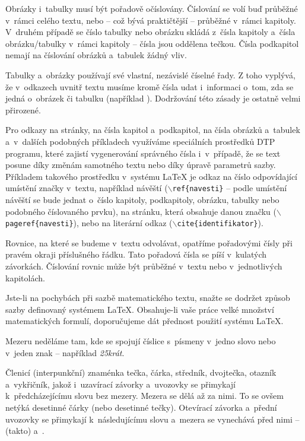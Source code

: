 Obrázky i~tabulky musí být pořadově očíslovány. Číslování se volí buď průběžné v~rámci celého textu, nebo -- což bývá praktičtější -- průběžné v~rámci kapitoly. V~druhém případě se číslo tabulky nebo obrázku skládá z~čísla kapitoly a~čísla obrázku/tabulky v~rámci kapitoly -- čísla jsou oddělena tečkou. Čísla podkapitol nemají na číslování obrázků a~tabulek žádný vliv.

Tabulky a~obrázky používají své vlastní, nezávislé číselné řady. Z toho vyplývá, že v~odkazech uvnitř textu musíme kromě čísla udat i~informaci o~tom, zda se jedná o~obrázek či tabulku (například ). Dodržování této zásady je ostatně velmi přirozené.

Pro odkazy na stránky, na čísla kapitol a~podkapitol, na čísla obrázků a~tabulek a~v~dalších podobných příkladech využíváme speciálních prostředků DTP programu, které zajistí vygenerování správného čísla i~v~případě, že se text posune díky změnám samotného textu nebo díky úpravě parametrů sazby. Příkladem takového prostředku v~systému LaTeX je odkaz na číslo odpovídající umístění značky v~textu, například návěští ($\backslash${\tt ref\{navesti\}} -- podle umístění návěští se bude jednat o~číslo kapitoly, podkapitoly, obrázku, tabulky nebo podobného číslovaného prvku), na stránku, která obsahuje danou značku ($\backslash${\tt pageref\{navesti\}}), nebo na literární odkaz ($\backslash${\tt cite\{identifikator\}}).

Rovnice, na které se budeme v~textu odvolávat, opatříme pořadovými čísly při pravém okraji příslušného řádku. Tato pořadová čísla se píší v~kulatých závorkách. Číslování rovnic může být průběžné v~textu nebo v~jednotlivých kapitolách.

Jste-li na pochybách při sazbě matematického textu, snažte se dodržet způsob sazby definovaný systémem LaTeX. Obsahuje-li vaše práce velké množství matematických formulí, doporučujeme dát přednost použití systému LaTeX.

Mezeru neděláme tam, kde se spojují číslice s~písmeny v~jedno slovo nebo v~jeden znak -- například {\it 25krát}.

Členicí (interpunkční) znaménka tečka, čárka, středník, dvojtečka, otazník a~vykřičník, jakož i~uzavírací závorky a~uvozovky se přimykají k~předcházejícímu slovu bez mezery. Mezera se dělá až za nimi. To se ovšem netýká desetinné čárky (nebo desetinné tečky). Otevírací závorka a~přední uvozovky se přimykají k~následujícímu slovu a~mezera se vynechává před nimi -- (takto) a~.

